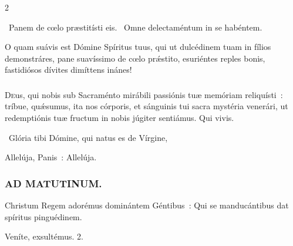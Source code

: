 \documentclass[9pt,twoside]{extarticle}
\begin{document}
\begin{multicols}{2}
\begin{tightlist}{}
\item {}~Panem de cœlo præstitísti eis. ~Omne delectaméntum in se habéntem.
\item {} O quam suávis est Dómine Spíritus tuus, qui ut dulcédinem tuam in fílios demonstráres, pane suavíssimo de cœlo prǽstito, esuriéntes reples bonis, fastidiósos dívites dimíttens inánes!
\end{tightlist}
\subsubsection*{\center {}}
\lettrine{D}eus, qui nobis sub Sacraménto mirábili passiónis tuæ memóriam reliquísti~: tríbue, quǽsumus, ita nos córporis, et sánguinis tui sacra mystéria venerári, ut redemptiónis tuæ fructum in nobis júgiter sentiámus. Qui vivis.

\begin{tightlist}{}
\item {}~Glória tibi Dómine, qui natus es de Vírgine, 
\item {} Allelúja, Panis~:  Allelúja.
\end{tightlist}

\subsubsection*{\center \textsc{AD MATUTINUM.}}
\begin{tightlist}{}
\item {} Christum Regem adorémus dominántem Géntibus~: \textred{*} Qui se manducántibus dat spíritus pinguédinem.
\item {} Veníte, exsultémus. 2.
\end{tightlist}


\end{multicols}
\end{document}
